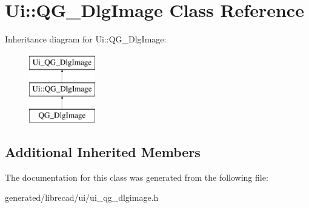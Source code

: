 \hypertarget{classUi_1_1QG__DlgImage}{\section{Ui\-:\-:Q\-G\-\_\-\-Dlg\-Image Class Reference}
\label{classUi_1_1QG__DlgImage}
}
Inheritance diagram for Ui\-:\-:Q\-G\-\_\-\-Dlg\-Image\-:\begin{figure}[H]
\begin{center}
\leavevmode
\includegraphics[height=3.000000cm]{classUi_1_1QG__DlgImage}
\end{center}
\end{figure}
\subsection*{Additional Inherited Members}


The documentation for this class was generated from the following file\-:\begin{DoxyCompactItemize}
\item 
generated/librecad/ui/ui\-\_\-qg\-\_\-dlgimage.\-h\end{DoxyCompactItemize}

